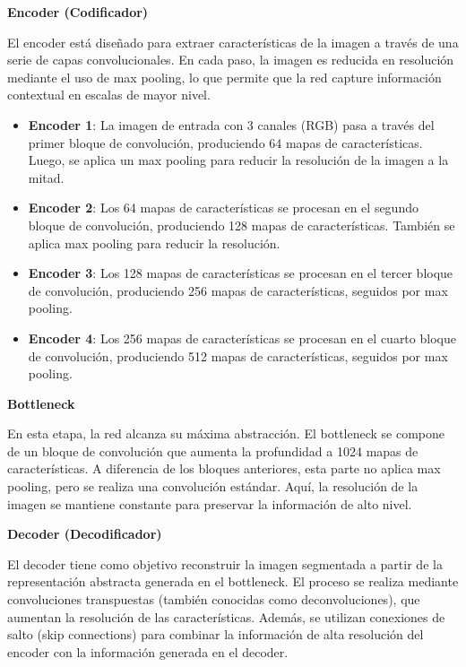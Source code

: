 \begin{enumerate}
\begin{itemize}
\textbf{Encoder (Codificador)}

El encoder está diseñado para extraer características de la imagen a través de una serie de capas convolucionales. En cada paso, la imagen es reducida en resolución mediante el uso de max pooling, lo que permite que la red capture información contextual en escalas de mayor nivel.

\begin{itemize}
    \item \textbf{Encoder 1}: La imagen de entrada con 3 canales (RGB) pasa a través del primer bloque de convolución, produciendo 64 mapas de características. Luego, se aplica un max pooling para reducir la resolución de la imagen a la mitad.
    \item \textbf{Encoder 2}: Los 64 mapas de características se procesan en el segundo bloque de convolución, produciendo 128 mapas de características. También se aplica max pooling para reducir la resolución.
    \item \textbf{Encoder 3}: Los 128 mapas de características se procesan en el tercer bloque de convolución, produciendo 256 mapas de características, seguidos por max pooling.
    \item \textbf{Encoder 4}: Los 256 mapas de características se procesan en el cuarto bloque de convolución, produciendo 512 mapas de características, seguidos por max pooling.
\end{itemize}

\textbf{Bottleneck}

En esta etapa, la red alcanza su máxima abstracción. El bottleneck se compone de un bloque de convolución que aumenta la profundidad a 1024 mapas de características. A diferencia de los bloques anteriores, esta parte no aplica max pooling, pero se realiza una convolución estándar. Aquí, la resolución de la imagen se mantiene constante para preservar la información de alto nivel.

\textbf{Decoder (Decodificador)}

El decoder tiene como objetivo reconstruir la imagen segmentada a partir de la representación abstracta generada en el bottleneck. El proceso se realiza mediante convoluciones transpuestas (también conocidas como deconvoluciones), que aumentan la resolución de las características. Además, se utilizan conexiones de salto (skip connections) para combinar la información de alta resolución del encoder con la información generada en el decoder.


\end{itemize}
\end{enumerate}
